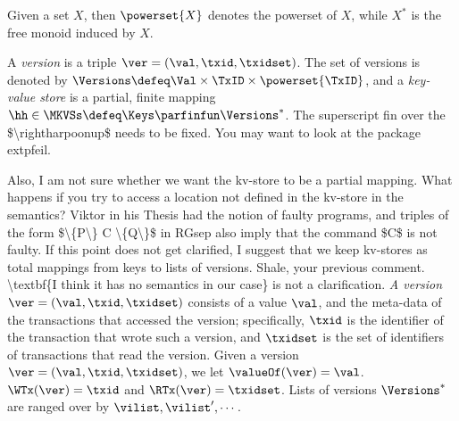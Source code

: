 Given a set $X$, then $\powerset{X}$ denotes 
the powerset of $X$, while $X^{\ast}$ is the free monoid induced by $X$.


\begin{definition}
\label{def:his_heap}
\label{def:mkvs}
A \emph{version} is a triple $\ver = (\val, \txid, \txidset)$. The set of versions is denoted by $\Versions \defeq \Val \times \TxID \times \powerset{\TxID}$, 
and a \emph{key-value store} is a partial, finite mapping $\hh \in \MKVSs \defeq \Keys \parfinfun \Versions^{\ast}$. 
\ac{ The superscript fin over the $\rightharpoonup$ needs to be fixed. You may want to look at the package extpfeil.}
\end{definition}
\ac{Also, I am not sure whether we want the kv-store to be a partial mapping. What happens if you try to access a location not 
defined in the kv-store in the semantics? Viktor in his Thesis had the notion of faulty programs, and triples of the form 
$\{P\} C \{Q\}$ in RGsep also imply that the command $C$ is not faulty. If this point  does not get clarified, 
I suggest that we keep kv-stores as total mappings from keys to lists of versions. Shale, 
your previous comment. \textbf{I think it has no semantics in our case} is not a clarification.}
\emph{A version} $\ver = (\val, \txid, \txidset)$ consists of a value $\val$, and the meta-data of the transactions 
that accessed the version; specifically, $\txid$ is the identifier of the transaction that wrote such a version, 
and $\txidset$ is the set of identifiers of transactions that read the version.
Given a version $\ver = (\val, \txid, \txidset)$, we let $\valueOf(\ver) = \val$. 
$\WTx(\ver) = \txid$ and $\RTx(\ver) = \txidset$.
Lists of versions $\Versions^{\ast}$ are ranged over by $\vilist, \vilist',\cdots$.

